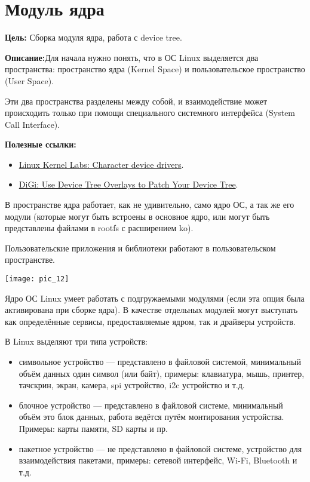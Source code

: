 \chapter{Модуль ядра}\label{lab:char_dev}
\textbf{Цель:} Сборка модуля ядра, работа с device tree.

\vspace{5mm}
\textbf{Описание:}Для начала нужно понять, что в ОС Linux выделяется два пространства: пространство ядра (Kernel Space) и пользовательское пространство (User Space).

Эти два пространства разделены между собой, и взаимодействие может происходить только при помощи специального системного интерфейса (System Call Interface).

\vspace{5mm}
\textbf{Полезные ссылки:}
\begin{itemize}
	\item \href{https://linux-kernel-labs.github.io/refs/heads/master/labs/device_drivers.html}{Linux Kernel Labs: Character device drivers}.
	\item \href{https://www.digi.com/resources/examples-guides/use-device-tree-overlays-to-patch-your-device-tree}{DiGi: Use Device Tree Overlays to Patch Your Device Tree}.
\end{itemize}

В пространстве ядра работает, как не удивительно, само ядро ОС, а так же его модули (которые могут быть встроены в основное ядро, или могут быть представлены файлами в rootfs с расширением ko).

Пользовательские приложения и библиотеки работают в пользовательском пространстве. 

\begin{center}
	\texttt{[image: pic\_12]}
\end{center}

Ядро ОС Linux умеет работать с подгружаемыми модулями (если эта опция была активирована при сборке ядра). В качестве отдельных модулей могут выступать как определённые сервисы, предоставляемые ядром, так и драйверы устройств.

В Linux выделяют три типа устройств:
\begin{itemize}
	\item символьное устройство — представлено в файловой системой, минимальный объём данных один символ (или байт), примеры: клавиатура, мышь, принтер, тачскрин, экран, камера, spi устройство, i2c устройство и т.д. 
	\item блочное устройство — представлено в файловой системе, минимальный объём это блок данных, работа ведётся путём монтирования устройства. Примеры: карты памяти, SD карты и пр.  
	\item пакетное устройство — не представлено в файловой системе, устройство для взаимодействия пакетами, примеры: сетевой интерфейс, Wi-Fi, Bluetooth и т.д. 
\end{itemize}

